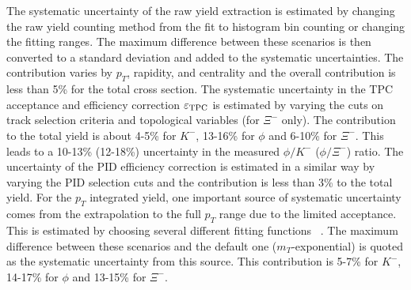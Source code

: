 \documentclass[%
 reprint,	
showpacs,
 amsmath,amssymb,
 aps,
 prc,
]{revtex4-1}
\begin{document}
The systematic uncertainty of the raw yield extraction is estimated by changing the raw yield counting method from the fit to histogram bin counting or changing the fitting ranges. The maximum difference between these scenarios is then converted to a standard deviation and added to the systematic uncertainties. The contribution varies by $p_T$, rapidity, and centrality %
and the overall contribution is less than 5\% for the total cross section. The systematic uncertainty in the TPC acceptance and efficiency correction $\varepsilon_{\rm TPC}$ is estimated %
by varying the cuts on track selection criteria and topological variables (for $\Xi^-$ only). %
The contribution to the total yield is about 4-5\% for $K^-$, 13-16\% for $\phi$ and 6-10\% for $\Xi^-$. This leads to a 10-13\% (12-18\%) uncertainty in the measured $\phi/K^-$ ($\phi/\Xi^-$) ratio. 
The uncertainty of the PID efficiency correction is estimated in a similar way by varying the PID selection cuts and the contribution is less than 3\% to the total yield.
For the $p_T$ integrated yield, one important source of systematic uncertainty comes from the extrapolation to the full $p_T$ range due to the limited acceptance. This is estimated by choosing several different fitting functions %
~\cite{STAR_particleYield}. The maximum difference between these scenarios and the default one ($m_T$-exponential) is quoted as the systematic uncertainty from this source. This contribution is 5-7\% for $K^-$, 14-17\% for $\phi$ and 13-15\% for $\Xi^-$. 
\end{document}
